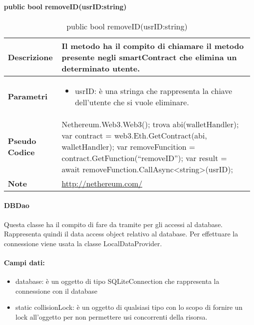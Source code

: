 \paragraph{public bool removeID(usrID:string)}
\begin{center}
    \begin{longtable}{|p{3cm}|p{9cm}|}%
    \caption{public bool removeID(usrID:string)}
    \label{tab:public-bool-removeIDImpl}
    \endfirsthead
    \endhead
    \hline
    \textbf{Descrizione} & Il metodo ha il compito di chiamare il metodo presente negli smartContract che elimina un determinato utente.\\
    \hline
    \textbf{Parametri} &      
    \begin{itemize}
        \item usrID: è una stringa che rappresenta la chiave dell’utente che si vuole eliminare.
    \end{itemize} 
    \\
    \hline
    \textbf{Pseudo Codice} & 
    Nethereum.Web3.Web3();\newline
    trova abi(walletHandler);\newline
    var contract = web3.Eth.GetContract(abi, walletHandler);\newline
    var removeFuncition = contract.GetFunction(“removeID”);\newline
    var result = await removeFunction.CallAsync<string>(usrID);\newline
    \\
    \hline
    \textbf{Note} & \url{http://nethereum.com/}\\
    \hline
    \end{longtable}
    \end{center}

\paragraph{DBDao}
Questa classe ha il compito di fare da tramite per gli accessi al database. Rappresenta quindi il data access object relativo al database. Per effettuare la connessione viene usata la classe LocalDataProvider.
\paragraph{Campi dati:}
\begin{itemize}
    \item database: è un oggetto di tipo SQLiteConnection che rappresenta la connessione con il database
    \item static collisionLock: è un oggetto di qualsiasi tipo con lo scopo di fornire un lock all’oggetto per non permettere usi concorrenti della risorsa.
\end{itemize}

